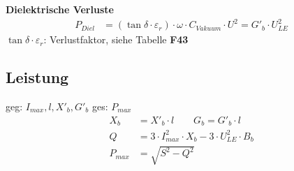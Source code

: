\textbf{Dielektrische Verluste}
\begin{align*}
    P_{Diel} &= (\tan \delta \cdot \varepsilon_{r}) \cdot \omega \cdot C_{\mathit{Vakuum}} \cdot U^2 = G'_b\cdot U^2_{LE}
\end{align*}
\indent $\tan \delta \cdot \varepsilon_{r}$: Verlustfaktor, siehe Tabelle \textbf{F43}


\subsection{Leistung}
geg: $I_{max} , l , X'_b, G'_b$ \qquad ges: $P_{max}$
\begin{align*}
    X_b &= X'_b \cdot l \qquad G_b = G'_b \cdot l \\
    Q &= 3 \cdot I^2_{max} \cdot X_b - 3 \cdot U^2_{LE} \cdot B_b\\
    P_{max} &= \sqrt{S^2-Q^2}
\end{align*}
